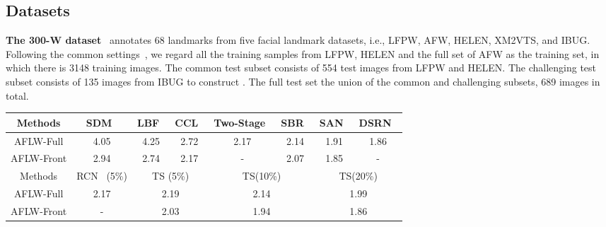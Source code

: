 \documentclass[10pt,twocolumn,letterpaper]{article}
\def\NAME{{{TS}}} \def\LLB{\textcolor{red}}
\begin{document}
\subsection{Datasets}\label{sec:datasets}

\textbf{The 300-W dataset}~\cite{sagonas2013300} annotates 68 landmarks from five facial landmark datasets, i.e., LFPW, AFW, HELEN, XM2VTS, and IBUG.
Following the common settings~\cite{dong2018sbr,dong2018san,lv2017deep}, we regard all the training samples from LFPW, HELEN and the full set of AFW as the training set, in which there is 3148 training images.
The common test subset consists of 554 test images from LFPW and HELEN.
The challenging test subset consists of 135 images from IBUG to construct .
The full test set the union of the common and challenging subsets, 689 images in total.




\begin{table*}[t]
\setlength{\tabcolsep}{6pt}
\centering
\begin{tabular}{|c|c c c c c c c|} \hline\hline
Methods    & SDM~\cite{xiong2013supervised} & LBF~\cite{ren2016face} & CCL~\cite{zhu2016unconstrained} & Two-Stage~\cite{lv2017deep} & SBR~\cite{dong2018san} & SAN~\cite{dong2018san}   & DSRN~\cite{miao2018direct} \\ \hline
AFLW-Full  & 4.05                           & 4.25                   & 2.72                            & 2.17                        & 2.14                   & 1.91   & 1.86 \\ \hline
AFLW-Front & 2.94                           & 2.74                   & 2.17                            & -                           & 2.07                   & 1.85  & - \\\hline\hline
Methods    & RCN~\cite{honari2018improving} (5\%) & \multicolumn{2}{c}{{\NAME} (5\%)} & \multicolumn{2}{c}{{\NAME}(10\%)} & \multicolumn{2}{c|}{{\NAME}(20\%)} \\\hline
AFLW-Full  & 2.17                                       & \multicolumn{2}{c}{2.19}       & \multicolumn{2}{c}{2.14} & \multicolumn{2}{c|}{1.99}\\\hline
AFLW-Front & -                                          & \multicolumn{2}{c}{2.03}       & \multicolumn{2}{c}{1.94} & \multicolumn{2}{c|}{1.86} \\\hline\hline
\end{tabular}
\vspace{2mm}
\caption{
Comparisons of NME normalized by face size on the AFLW dataset.
 indicates that SBR~\cite{dong2018sbr} used additional unlabeled video data during training.
The ratio number in the brackets represents the portion of the labels that we use. Compared to the semi-supervised algorithm~\cite{honari2018improving}, our {\NAME} obtains a similar NME result (2.19 vs. 2.17).
Compared to supervised algorithms which use 100\% labels, our {\NAME} obtains competitive NME when using only 20\% labels.
}
\label{table:aflw}
\end{table*}
\end{document}
